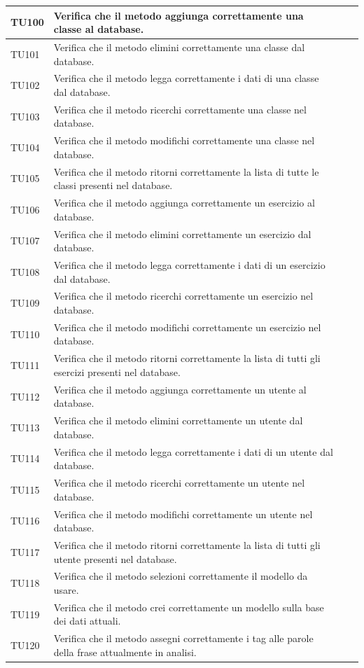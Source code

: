\begin{longtable}{|>{\centering\arraybackslash}m{1.6cm}|>{\centering\arraybackslash}m{6.41cm}|>{\centering\arraybackslash}m{3.1cm}| c |}
		TU100 & Verifica che il metodo aggiunga correttamente una classe al database. \\ \hline
		TU101 & Verifica che il metodo elimini correttamente una classe dal database. \\ \hline
		TU102 & Verifica che il metodo legga correttamente i dati di una classe dal database. \\ \hline
		TU103 & Verifica che il metodo ricerchi correttamente una classe nel database. \\ \hline
		TU104 & Verifica che il metodo modifichi correttamente una classe nel database. \\ \hline
		TU105 & Verifica che il metodo ritorni correttamente la lista di tutte le classi presenti nel database.  \\ \hline	
		TU106 & Verifica che il metodo aggiunga correttamente un esercizio al database. \\ \hline
		TU107 & Verifica che il metodo elimini correttamente un esercizio dal database. \\ \hline
		TU108 & Verifica che il metodo legga correttamente i dati di un esercizio dal database. \\ \hline
		TU109 & Verifica che il metodo ricerchi correttamente un esercizio nel database. \\ \hline
		TU110 & Verifica che il metodo modifichi correttamente un esercizio nel database. \\ \hline
		TU111 & Verifica che il metodo ritorni correttamente la lista di tutti gli esercizi presenti nel database.  \\ \hline	
		TU112 & Verifica che il metodo aggiunga correttamente un utente al database. \\ \hline
		TU113 & Verifica che il metodo elimini correttamente un utente dal database. \\ \hline
		TU114 & Verifica che il metodo legga correttamente i dati di un utente dal database. \\ \hline
		TU115 & Verifica che il metodo ricerchi correttamente un utente nel database. \\ \hline
		TU116 & Verifica che il metodo modifichi correttamente un utente nel database. \\ \hline
		TU117 & Verifica che il metodo ritorni correttamente la lista di tutti gli utente presenti nel database.  \\ \hline
		TU118 & Verifica che il metodo selezioni correttamente il modello da usare.  \\ \hline
		TU119 & Verifica che il metodo crei correttamente un modello sulla base dei dati attuali.  \\ \hline
		TU120 & Verifica che il metodo assegni correttamente i tag alle parole della frase attualmente in analisi.  \\ \hline
		

\end{longtable}
